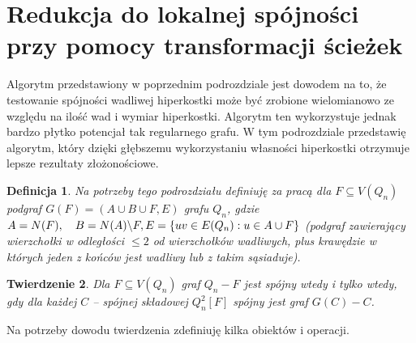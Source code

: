\documentclass{pracamgr}
\newtheorem{theorem}{Twierdzenie}[chapter]
\newtheorem{defi}[theorem]{Definicja}
\begin{document}
  \section{Redukcja do lokalnej spójności przy pomocy transformacji ścieżek}\label{spojnosc 2}
   Algorytm przedstawiony w poprzednim podrozdziale jest dowodem na to, że testowanie spójności wadliwej hiperkostki może być zrobione wielomianowo
   ze względu na ilość wad i wymiar hiperkostki. Algorytm ten wykorzystuje jednak bardzo płytko potencjał tak regularnego grafu.
   W tym podrozdziale przedstawię algorytm, który dzięki głębszemu wykorzystaniu własności hiperkostki otrzymuje lepsze rezultaty złożonościowe.
   \begin{defi}\label{podgrafy kostki}
    Na potrzeby tego podrozdziału definiuję za pracą \cite{DFGKR} dla $F\subseteq V(Q_n)$\newline
    podgraf $G(F)=(A\cup B\cup F,E)$ grafu $Q_n$,
    gdzie $A=N(F),\quad B=N(A)\backslash F,\newline E=\{uv\in E(Q_n):u\in A\cup F\}$ (podgraf zawierający wierzchołki w odległości $\le 2$ od wierzchołków wadliwych,
    plus krawędzie w których jeden z końców jest wadliwy lub z takim sąsiaduje).
   \end{defi}
   \begin{theorem}\label{spojnosc z lokalnej spojnosci}
    Dla $F\subseteq V(Q_n)$ graf $Q_n-F$ jest spójny wtedy i tylko wtedy, gdy dla każdej $C$ -- spójnej składowej $Q_n^2[F]$ spójny jest graf $G(C)-C$.
   \end{theorem}
   Na potrzeby dowodu twierdzenia zdefiniuję kilka obiektów i operacji.
\end{document}
